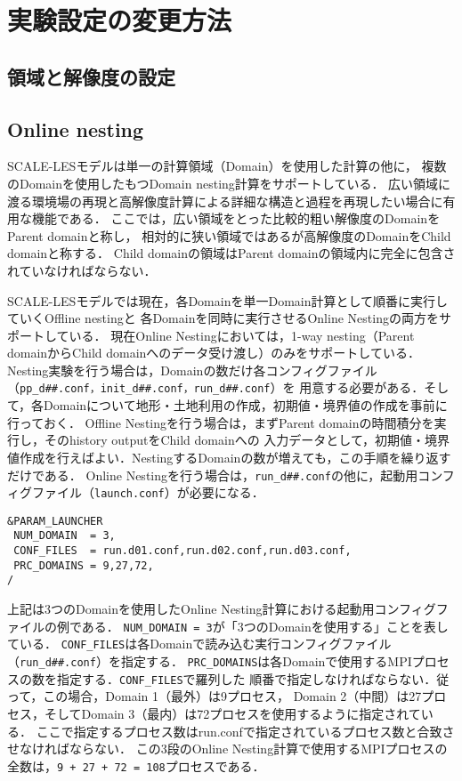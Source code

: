 \section{実験設定の変更方法}
\subsection{領域と解像度の設定}





\subsection{Online nesting}

SCALE-LESモデルは単一の計算領域（Domain）を使用した計算の他に，
複数のDomainを使用したもつDomain nesting計算をサポートしている．
広い領域に渡る環境場の再現と高解像度計算による詳細な構造と過程を再現したい場合に有用な機能である．
ここでは，広い領域をとった比較的粗い解像度のDomainをParent domainと称し，
相対的に狭い領域ではあるが高解像度のDomainをChild domainと称する．
Child domainの領域はParent domainの領域内に完全に包含されていなければならない．

SCALE-LESモデルでは現在，各Domainを単一Domain計算として順番に実行していくOffline nestingと
各Domainを同時に実行させるOnline Nestingの両方をサポートしている．
現在Online Nestingにおいては，1-way nesting（Parent domainからChild domainへのデータ受け渡し）のみをサポートしている．
Nesting実験を行う場合は，Domainの数だけ各コンフィグファイル（\verb|pp_d##.conf，init_d##.conf，run_d##.conf|）を
用意する必要がある．そして，各Domainについて地形・土地利用の作成，初期値・境界値の作成を事前に行っておく．
Offline Nestingを行う場合は，まずParent domainの時間積分を実行し，そのhistory outputをChild domainへの
入力データとして，初期値・境界値作成を行えばよい．NestingするDomainの数が増えても，この手順を繰り返すだけである．
Online Nestingを行う場合は，\verb|run_d##.conf|の他に，起動用コンフィグファイル（\verb|launch.conf|）が必要になる．

\vspace{0.5cm}
\begin{verbatim}
&PARAM_LAUNCHER
 NUM_DOMAIN  = 3,
 CONF_FILES  = run.d01.conf,run.d02.conf,run.d03.conf,
 PRC_DOMAINS = 9,27,72,
/
\end{verbatim}

上記は3つのDomainを使用したOnline Nesting計算における起動用コンフィグファイルの例である．
\verb|NUM_DOMAIN = 3|が「3つのDomainを使用する」ことを表している．
\verb|CONF_FILES|は各Domainで読み込む実行コンフィグファイル（\verb|run_d##.conf|）を指定する．
\verb|PRC_DOMAINS|は各Domainで使用するMPIプロセスの数を指定する．\verb|CONF_FILES|で羅列した
順番で指定しなければならない．従って，この場合，Domain 1（最外）は9プロセス，
Domain 2（中間）は27プロセス，そしてDomain 3（最内）は72プロセスを使用するように指定されている．
ここで指定するプロセス数はrun.confで指定されているプロセス数と合致させなければならない．
この3段のOnline Nesting計算で使用するMPIプロセスの全数は，\verb|9 + 27 + 72 = 108|プロセスである．

